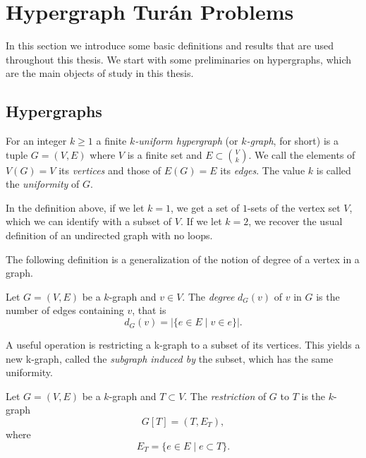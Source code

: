 
\section{Hypergraph Turán Problems}\label{sec:preliminaries}
In this section we introduce some basic definitions and results that are used throughout this thesis.
We start with some preliminaries on hypergraphs, which are the main objects of study in this thesis.

\subsection{Hypergraphs}\label{subsec:hypergraphs}

\begin{definition}

    For an integer $k \geq 1$ a finite \emph{$k$-uniform hypergraph} (or \emph{$k$-graph}, for short)
    is a tuple $G = (V, E)$ where $V$ is a finite set
    and $E \subset \binom{V}{k}$.
    We call the elements of $V(G) = V$ its \emph{vertices}
    and those of $E(G) = E$ its \emph{edges}.
    The value $k$ is called the \emph{uniformity} of $G$.
\end{definition}

\begin{remark}
    In the definition above, if we let $k=1$, we get a set of $1$-sets of the vertex set $V$,
    which we can identify with a subset of $V$.
    If we let $k=2$, we recover the usual definition of an undirected graph with no loops.
\end{remark}

The following definition is a generalization of the notion of degree
of a vertex in a graph.

\begin{definition}
    Let $G = (V, E)$ be a $k$-graph and $v \in V$.
    The \emph{degree} $d_G(v)$ of $v$ in $G$
    is the number of edges containing $v$, that is
    \[
        d_G(v) = |\{e \in E \mid v \in e\}|.
    \]
\end{definition}

A useful operation is restricting a k-graph to a subset of its vertices.
This yields a new k-graph, called the \emph{subgraph induced by} the subset, which has the same uniformity.

\begin{definition}

    \label{def:restriction}
    Let $G = (V, E)$ be a $k$-graph and $T \subset V$.
    The \emph{restriction} of $G$ to $T$ is the $k$-graph
    \[
        G[T] = (T, E_T),
    \]
    where
    \[E_T = \{e \in E \mid e \subset T\}.\]
\end{definition}


